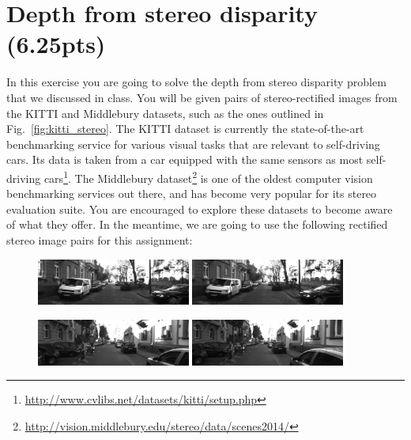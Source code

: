 \documentclass[a4paper,10pt]{article}
\begin{document}
\section{Depth from stereo disparity (6.25pts)}
In this exercise you are going to solve the depth from stereo disparity problem that we discussed in class. You will be given pairs of stereo-rectified images from the 
KITTI and Middlebury datasets, such as the ones outlined in Fig.~\ref{fig:kitti_stereo}. The KITTI dataset is currently the state-of-the-art benchmarking service for various 
visual tasks that are relevant to self-driving cars. Its data is taken from a car equipped with the same sensors as most self-driving cars\footnote{\url{http://www.cvlibs.net/datasets/kitti/setup.php}}.
The Middlebury dataset\footnote{\url{http://vision.middlebury.edu/stereo/data/scenes2014/}} is one of the oldest computer vision benchmarking services out there, and has become
very popular for its stereo evaluation suite. You are encouraged to explore these datasets to become aware of what they offer. In the meantime, we are going to use the following rectified stereo 
image pairs for this assignment:
\begin{figure}[h!]
  \begin{center}
    \includegraphics[width=0.45\textwidth]{stereo_images/images0/kitti_1_left}
    \includegraphics[width=0.45\textwidth]{stereo_images/images1/kitti_1_right}
  \end{center}
\end{figure}  

\begin{figure}[h!]
  \begin{center}  
    \includegraphics[width=0.45\textwidth]{stereo_images/images0/kitti_2_left}
    \includegraphics[width=0.45\textwidth]{stereo_images/images1/kitti_2_right}
\end{center}
\end{figure}  
    
\end{document}
